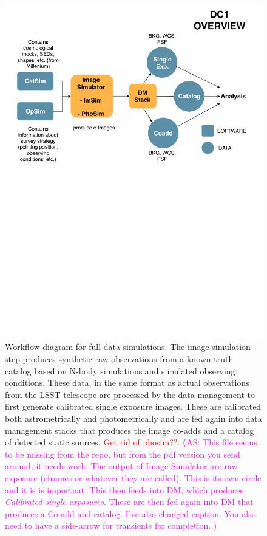 \documentclass[twocolumn]{aastex62}
\newcommand{\as}[1]{{\textcolor{magenta}{{\textbf (AS: #1)}}}}
\begin{document}
\begin{figure}
\centering
 \includegraphics[trim={1cm 1cm 1.0cm 0.5cm}, clip, width=1.0\columnwidth]{dc1_workflow}
\caption{Workflow diagram for full data simulations. The image simulation step produces synthetic raw observations from a known truth catalog based on N-body simulations and simulated observing conditions. These data, in the same format as actual observations from the LSST telescope are processed by the data management to first generate calibrated single exposure images. These are calibrated both astrometrically and photometrically and are fed again into data management stacks that produces the image co-adds and a catalog of detected static sources.  \textcolor{red}{Get rid of phosim??}.
  \as{This file seems to be missing from the repo, but from the pdf version
    you send around, it needs work: The output of Image Simulator are raw exposure (eframes or whatever they are called). This is its own circle and it is is importnat. This then feeds into DM, which produces \emph{Calibrated single exposures}. These are then fed again into DM that produces a Co-add and catalog. I've also changed caption. You also need to have a side-arrow for transients for completion. }
}

\label{fig:dc1_workflow}
\end{figure}
\end{document}
